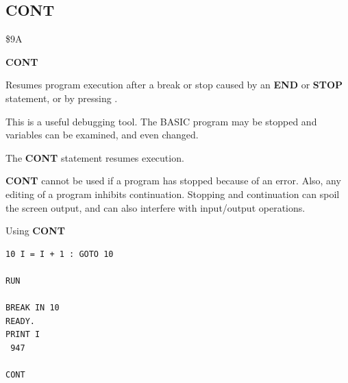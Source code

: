 
\newpage
\subsection{CONT}
\begin{description}[leftmargin=2cm,style=nextline]
\item [Token:]   \$9A

\item [Format:]  {\bf CONT}

\item [Usage:]   Resumes program execution after a break or stop caused by an {\bf END} or {\bf STOP} statement, or by pressing .

                 This is a useful debugging tool. The BASIC program may be stopped and variables can be examined, and even changed.

                 The {\bf CONT} statement resumes execution.

\item [Remarks:] {\bf CONT} cannot be used if a program has stopped because of an error. Also, any editing of a program inhibits continuation. Stopping and continuation can spoil the screen output, and can also interfere with input/output operations.

\item [Example:] Using {\bf CONT}

\begin{tcolorbox}[colback=black,coltext=white]
\verbatimfont{\codefont}
\begin{verbatim}
10 I = I + 1 : GOTO 10

RUN

BREAK IN 10
READY.
PRINT I
 947

CONT
\end{verbatim}
\end{tcolorbox}
\end{description}


\newpage
